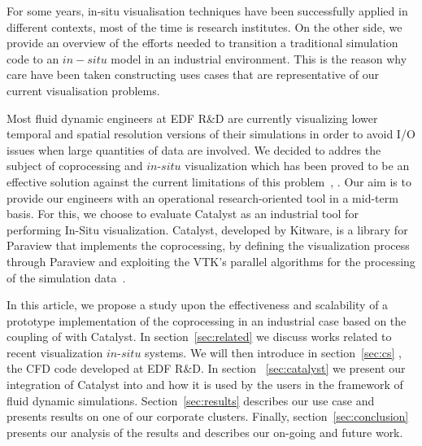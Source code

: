 For some years, in-situ visualisation techniques have been successfully applied in different contexts, most of the time is research institutes. On the other side, we provide an overview of the efforts needed to transition a traditional simulation code to an $in-situ$ model in an industrial environment. This is the reason why care have been taken constructing uses cases that are representative of our current visualisation problems. 

Most fluid dynamic engineers at EDF R\&D are currently visualizing lower temporal and spatial 
resolution versions of their simulations in order to avoid I/O issues when large quantities of data are involved.
We decided to addres the subject of coprocessing and $in$-$situ$
visualization which has been proved to be an effective solution against the current
limitations of this problem~\cite{sandiareport}, \cite{4090186}. Our aim is to provide 
our engineers with an operational research-oriented tool in a mid-term basis.
For this, we choose to evaluate Catalyst as an industrial tool for performing In-Situ visualization. 
Catalyst, developed by Kitware, is a library for Paraview that implements the
coprocessing, by defining the visualization process through Paraview and
exploiting the VTK's parallel algorithms for the processing of the simulation
data~\cite{6092322}. 

In this article, we propose a study upon the effectiveness and scalability of a
prototype implementation of the coprocessing in an industrial case based on the
coupling of \CS with Catalyst. In section~\ref{sec:related} we
discuss works related to recent visualization $in$-$situ$ systems. We will then
introduce in section~\ref{sec:cs} \CS, the CFD code developed at EDF
R\&D. In section ~\ref{sec:catalyst} we present our integration of Catalyst into
\CS and how it is used by the users in the framework of fluid dynamic
simulations. Section~\ref{sec:results} describes our use case and presents
results on one of our corporate clusters. Finally, section~\ref{sec:conclusion} 
presents our analysis of the results and describes our on-going and future work.
